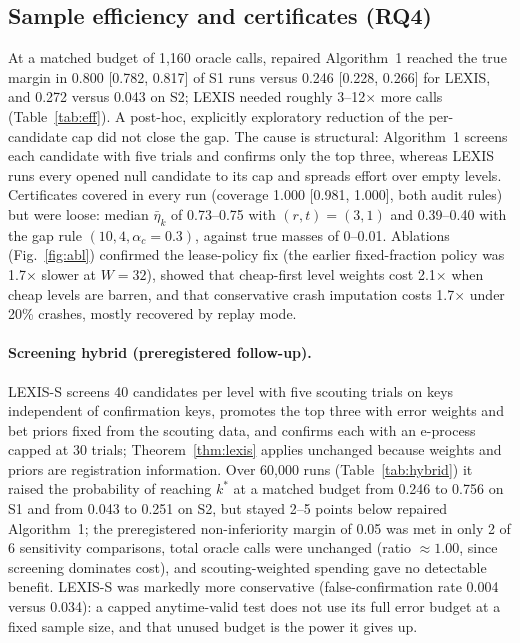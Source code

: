 \documentclass[11pt]{article}
\theoremstyle{definition}
\theoremstyle{remark}
\begin{document}
\subsection{Sample efficiency and certificates (RQ4)}
At a matched budget of 1,160 oracle calls, repaired Algorithm~1 reached the true margin in 0.800 [0.782, 0.817] of S1 runs versus 0.246 [0.228, 0.266] for LEXIS, and 0.272 versus 0.043 on S2; LEXIS needed roughly 3--12$\times$ more calls (Table~\ref{tab:eff}). A post-hoc, explicitly exploratory reduction of the per-candidate cap did not close the gap. The cause is structural: Algorithm~1 screens each candidate with five trials and confirms only the top three, whereas LEXIS runs every opened null candidate to its cap and spreads effort over empty levels. Certificates covered in every run (coverage 1.000 [0.981, 1.000], both audit rules) but were loose: median $\bar\eta_k$ of 0.73--0.75 with $(r,t)=(3,1)$ and 0.39--0.40 with the gap rule $(10,4,\alpha_c=0.3)$, against true masses of 0--0.01. Ablations (Fig.~\ref{fig:abl}) confirmed the lease-policy fix (the earlier fixed-fraction policy was 1.7$\times$ slower at $W=32$), showed that cheap-first level weights cost 2.1$\times$ when cheap levels are barren, and that conservative crash imputation costs 1.7$\times$ under 20\% crashes, mostly recovered by replay mode.

\paragraph{Screening hybrid (preregistered follow-up).} LEXIS-S screens 40 candidates per level with five scouting trials on keys independent of confirmation keys, promotes the top three with error weights and bet priors fixed from the scouting data, and confirms each with an e-process capped at 30 trials; Theorem~\ref{thm:lexis} applies unchanged because weights and priors are registration information. Over 60,000 runs (Table~\ref{tab:hybrid}) it raised the probability of reaching $k^*$ at a matched budget from 0.246 to 0.756 on S1 and from 0.043 to 0.251 on S2, but stayed 2--5 points below repaired Algorithm~1; the preregistered non-inferiority margin of 0.05 was met in only 2 of 6 sensitivity comparisons, total oracle calls were unchanged (ratio $\approx1.00$, since screening dominates cost), and scouting-weighted spending gave no detectable benefit. LEXIS-S was markedly more conservative (false-confirmation rate 0.004 versus 0.034): a capped anytime-valid test does not use its full error budget at a fixed sample size, and that unused budget is the power it gives up.
\end{document}
